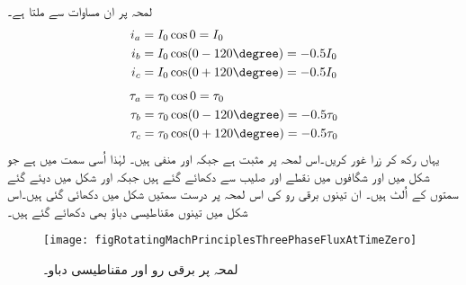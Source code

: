 لمحہ  پر ان مساوات سے ملتا ہے۔
\begin{gather}
\begin{aligned}
i_a&=I_0 \cos 0=I_0\\
i_b&=I_0 \cos (0-120\degree)=-0.5 I_0\\
i_c&=I_0 \cos (0+120\degree)=-0.5 I_0
\end{aligned}
\end{gather}
%
\begin{gather}
\begin{aligned}
\tau_a&=\tau_0 \cos 0=\tau_0\\
\tau_b&=\tau_0 \cos (0-120\degree)=-0.5 \tau_0\\
\tau_c&=\tau_0 \cos (0+120\degree)=-0.5 \tau_0
\end{aligned}
\end{gather}
یہاں رکھ کر زرا غور کریں۔اس لمحہ پر   مثبت ہے جبکہ  اور  منفی ہیں۔ لہٰذا   اُسی سمت میں ہے جو شکل   میں  اور  شگافوں میں نقطے اور صلیب سے  دکھائے  گئے ہیں جبکہ   اور  شکل میں دیئے گئے سمتوں کے اُلٹ ہیں۔ ان تینوں برقی رو کی اس لمحہ پر درست سمتیں شکل   میں دکھائی گئی ہیں۔اس شکل میں تینوں مقناطیسی دباؤ بھی دکھائے گئے ہیں۔
\begin{figure}
\centering
\texttt{[image: figRotatingMachPrinciplesThreePhaseFluxAtTimeZero]}
\caption{ لمحہ  پر برقی رو اور مقناطیسی دباو۔}
\label{شکل_گھومتے_مشین_لمحہ_صفر_پر_کل_دباو}
\end{figure}

